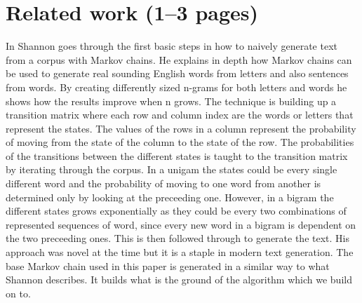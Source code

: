 \documentclass[a4paper,12pt]{article}
\begin{document}
\section{Related work (1--3 pages)}
\label{sec:relwork}
%

In \cite{shannon48} Shannon goes through the first basic steps in how to naively generate text from a corpus with Markov chains. 
He explains in depth how Markov chains can be used to generate real sounding English words from letters and also sentences from words. 
By creating differently sized n-grams for both letters and words he shows how the results improve when n grows. 
The technique is building up a transition matrix where each row and column index are the words or letters that represent the states. 
The values of the rows in a column represent the probability of moving from the state of the column to the state of the row. 
The probabilities of the transitions between the different states is taught to the transition matrix by iterating through the corpus.
In a unigam the states could be every single different word and the probability of moving to one word from another is determined only by looking at the preceeding one.
However, in a bigram the different states grows exponentially as they could be every two combinations of represented sequences of word, 
since every new word in a bigram is dependent on the two preceeding ones.
This is then followed through to generate the text.
His approach was novel at the time but it is a staple in modern text generation. 
The base Markov chain used in this paper is generated in a similar way to what Shannon describes. 
It builds what is the ground of the algorithm which we build on to.
\end{document}
